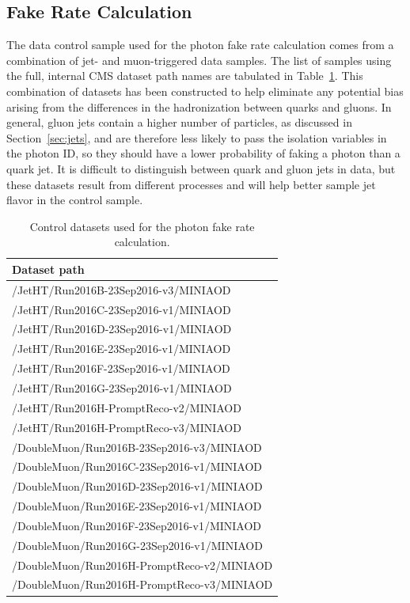 \subsection{Fake Rate Calculation}

The data control sample used for the photon fake rate calculation comes from a combination of jet- and muon-triggered data samples. The list of samples using the full, internal CMS dataset path names are tabulated in Table~\ref{tab:fake_rate_datasets}. This combination of datasets has been constructed to help eliminate any potential bias arising from the differences in the hadronization between quarks and gluons. In general, gluon jets contain a higher number of particles, as discussed in Section~\ref{sec:jets}, and are therefore less likely to pass the isolation variables in the photon ID, so they should have a lower probability of faking a photon than a quark jet. It is difficult to distinguish between quark and gluon jets in data, but these datasets result from different processes and will help better sample jet flavor in the control sample.

\begin{table}[!htbp]
  \caption{Control datasets used for the photon fake rate calculation.}
  \label{tab:fake_rate_datasets}
  \centering
  \vspace{\baselineskip}
  \small %
  \begin{tabular}{l}
  \hline
  \hline
  Dataset path \\
  \hline
  /JetHT/Run2016B-23Sep2016-v3/MINIAOD \\
  /JetHT/Run2016C-23Sep2016-v1/MINIAOD \\
  /JetHT/Run2016D-23Sep2016-v1/MINIAOD \\
  /JetHT/Run2016E-23Sep2016-v1/MINIAOD \\
  /JetHT/Run2016F-23Sep2016-v1/MINIAOD \\
  /JetHT/Run2016G-23Sep2016-v1/MINIAOD \\
  /JetHT/Run2016H-PromptReco-v2/MINIAOD \\
  /JetHT/Run2016H-PromptReco-v3/MINIAOD \\
  \hline
  /DoubleMuon/Run2016B-23Sep2016-v3/MINIAOD \\
  /DoubleMuon/Run2016C-23Sep2016-v1/MINIAOD \\
  /DoubleMuon/Run2016D-23Sep2016-v1/MINIAOD \\
  /DoubleMuon/Run2016E-23Sep2016-v1/MINIAOD \\
  /DoubleMuon/Run2016F-23Sep2016-v1/MINIAOD \\
  /DoubleMuon/Run2016G-23Sep2016-v1/MINIAOD \\
  /DoubleMuon/Run2016H-PromptReco-v2/MINIAOD \\
  /DoubleMuon/Run2016H-PromptReco-v3/MINIAOD \\
  \hline
  \hline
  \end{tabular}
\end{table}

